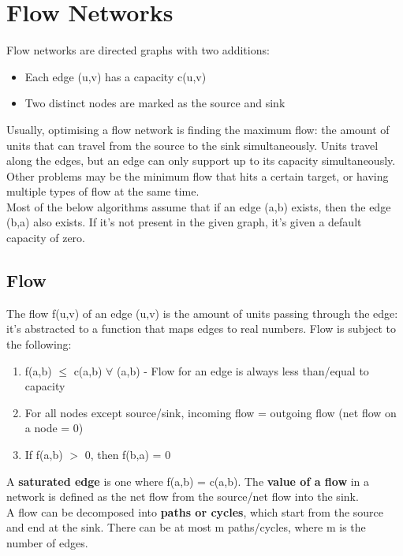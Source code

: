 \section{Flow Networks}
Flow networks are directed graphs with two additions:
\begin{itemize}
    \item Each edge (u,v) has a capacity c(u,v)
    \item Two distinct nodes are marked as the source and sink 
\end{itemize}
Usually, optimising a flow network is finding the maximum flow: the amount of units that can travel from the source to the sink simultaneously. Units travel along the edges, but an edge can only support up to its capacity simultaneously. Other problems may be the minimum flow that hits a certain target, or having multiple types of flow at the same time. \\
Most of the below algorithms assume that if an edge (a,b) exists, then the edge (b,a) also exists. If it's not present in the given graph, it's given a default capacity of zero.

\subsection{Flow}
The flow f(u,v) of an edge (u,v) is the amount of units passing through the edge: it's abstracted to a function that maps edges to real numbers. Flow is subject to the following:
\begin{enumerate}
    \item f(a,b) $\leq$ c(a,b) $\forall$ (a,b) - Flow for an edge is always less than/equal to capacity
    \item For all nodes except source/sink, incoming flow = outgoing flow (net flow on a node = 0)
    \item If f(a,b) $>$ 0, then f(b,a) = 0
\end{enumerate}
A \textbf{saturated edge} is one where f(a,b) = c(a,b). The \textbf{value of a flow} in a network is defined as the net flow from the source/net flow into the sink.\\
A flow can be decomposed into \textbf{paths or cycles}, which start from the source and end at the sink. There can be at most m paths/cycles, where m is the number of edges.




